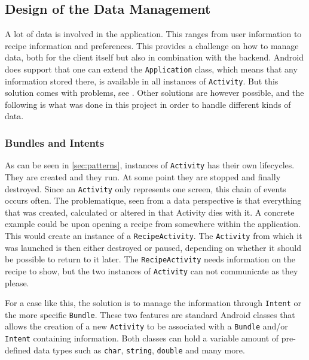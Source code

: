 \subsection{Design of the Data Management}
\label{subsec:designdatamanagement}

A lot of data is involved in the application. This ranges from user information to recipe information and preferences. This provides a challenge on how to manage data, both for the client itself but also in combination with the backend. Android does support that one can extend the \texttt{Application} class, which means that any information stored there, is available in all instances of \texttt{Activity}. But this solution comes with problems, see \citep{application_storage}. Other solutions are however possible, and the following is what was done in this project in order to handle different kinds of data.

\subsubsection{Bundles and Intents}
\label{subsubsec:bundles_and_intents}

As can be seen in \ref{sec:patterns}, instances of \texttt{Activity} has their own lifecycles. They are created and they run. At some point they are stopped and finally destroyed. Since an \texttt{Activity} only represents one screen, this chain of events occurs often. The problematique, seen from a data perspective is that everything that was created, calculated or altered in that Activity dies with it.
A concrete example could be upon opening a recipe from somewhere within the application. This would create an instance of a \texttt{RecipeActivity}. The \texttt{Activity} from which it was launched is then either destroyed or paused, depending on whether it should be possible to return to it later. The \texttt{RecipeActivity} needs information on the recipe to show, but the two instances of \texttt{Activity} can not communicate as they please.

For a case like this, the solution is to manage the information through \texttt{Intent} or the more specific \texttt{Bundle}. These two features are standard Android classes that allows the creation of a new \texttt{Activity} to be associated with a \texttt{Bundle} and/or \texttt{Intent} containing information\cite{intent}\cite{bundle}. Both classes can hold a variable amount of pre-defined data types such as \texttt{char}, \texttt{string}, \texttt{double} and many more.

